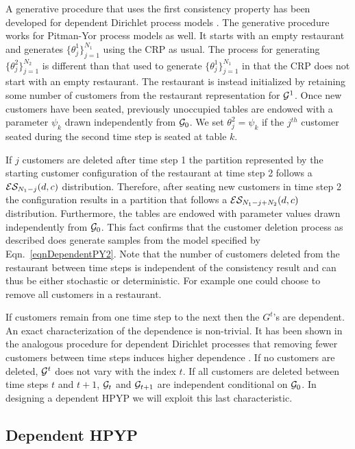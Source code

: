 A generative procedure that uses the first consistency property has been developed for dependent Dirichlet process models \cite{Caron2007}.  The generative procedure works for Pitman-Yor process models as well. It starts with an empty restaurant and generates $\{ \theta_j^1\}_{j= 1}^{N_1}$ using the CRP as usual.  The process for generating $\{ \theta_j^2\}_{j= 1}^{N_2}$ is different than that used to generate $\{ \theta_j^1\}_{j= 1}^{N_1}$ in that the CRP does not start with an empty restaurant.  The restaurant is instead initialized by retaining some number of customers from the restaurant representation for $\G^1$.  Once new customers have been seated, previously unoccupied tables are endowed with a parameter $\psi_k$ drawn independently from $\G_0$.  We set $\theta^2_j = \psi_k$ if  the $j^{th}$ customer seated during the second time step is seated at table $k$. 

If $j$ customers are deleted after time step 1 the partition represented by the starting customer configuration of the restaurant at time step 2 follows a $\ES_{N_1- j}(d,c)$ distribution.  Therefore, after seating new customers in time step 2 the configuration results in a partition that follows a $\ES_{N_1 - j + N_2}(d,c)$ distribution. Furthermore, the tables are endowed with parameter values drawn independently from $\G_0$.  This fact confirms that the customer deletion process as described does generate samples from the model specified by Eqn.~\ref{eqnDependentPY2}. Note that the number of customers deleted from the restaurant between time steps is independent of the consistency result and can thus be either stochastic or deterministic. For example one could choose to remove all customers in a restaurant.

If customers remain from one time step to the next then the $G^t$'s are dependent.  An exact characterization of the dependence is non-trivial.   It has been shown in the analogous procedure for dependent Dirichlet processes that removing fewer customers between time steps induces higher dependence \cite{Caron2007}.  If no customers are deleted, $\G^t$ does not vary with the index $t$.  If all customers are deleted between time steps $t$ and $t+1$,  $\G_t$ and $\G_{t+1}$ are independent conditional on $\G_0$.  In designing a dependent HPYP we will exploit this last characteristic.

\subsection{Dependent HPYP}
\label{sec:dhpyp}

